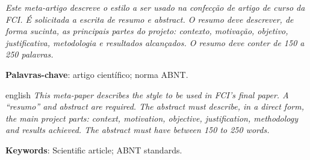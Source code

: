 \documentclass[
	article,			%
	11pt,				%
	oneside,			%
	a4paper,			%
	english,			%
	brazil,				%
	sumario=tradicional
	]{abntex2}
\begin{document}

\frenchspacing 


%
%

\maketitle



\begin{resumoumacoluna}
\textit{Este meta-artigo descreve o estilo a ser usado na confecção de artigo de curso da FCI. É solicitada a escrita de resumo e abstract. O resumo deve descrever, de forma sucinta, as principais partes do projeto: contexto, motivação, objetivo, justificativa, metodologia e resultados alcançados. O resumo deve conter de 150 a 250 palavras.}
 
 \vspace{\onelineskip}
 
 \noindent
 \textbf{Palavras-chave}: artigo científico; norma ABNT.
\end{resumoumacoluna}


\renewcommand{\resumoname}{Abstract}
\begin{resumoumacoluna}
 \begin{otherlanguage*}{english}
\textit{This meta-paper describes the style to be used in FCI’s final paper. A “resumo” and abstract are required. The abstract must describe, in a direct form, the main project parts: context, motivation, objective, justification, methodology and results achieved. The abstract must have between 150 to 250 words.}

   \vspace{\onelineskip}
 
   \noindent
   \textbf{Keywords}: Scientific article; ABNT standards.
 \end{otherlanguage*}  
\end{resumoumacoluna}
\end{document}

